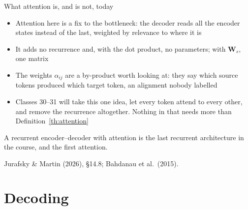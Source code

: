 \documentclass[aspectratio=169, 11pt]{beamer}
\newcommand{\srcline}[1]{%
  \par\vspace{0.25em}%
  {\scriptsize\color{mcMuted}\hfill #1\par}}
\newcommand{\src}[3]{}      %
\begin{document}
\begin{frame}{What attention is, and is not, today}
  \src{jurafsky_slp3}{section}{14.8}
  \src{bahdanau2015}{section}{3.1}
  \src{bahdanau2015}{section}{5.2.1}
  \vspace{0.05em}
  {\footnotesize
  \begin{itemize}\itemsep0.30em
    \item Attention here is a \alert{fix to the bottleneck}: the decoder
          reads all the encoder states instead of the last, weighted
          by relevance to where it is
    \item It adds no recurrence and, with the dot product, no
          parameters; with $\mathbf{W}_s$, one matrix
    \item The weights $\alpha_{ij}$ are a by-product worth looking at:
          they say which source tokens produced which target token,
          an alignment nobody labelled
    \item Classes 30--31 will take this one idea, let every token attend
          to every other, and remove the recurrence altogether. Nothing
          in that needs more than Definition~\ref{th:attention}
  \end{itemize}}
  \vspace{0.3em}
  \begin{redhighlight}
    A recurrent encoder--decoder with attention is the last recurrent
    architecture in the course, and the first attention.
  \end{redhighlight}
  \srcline{Jurafsky \& Martin (2026), \S14.8; Bahdanau et al.\ (2015).}
\end{frame}

\section{Decoding}
\end{document}
